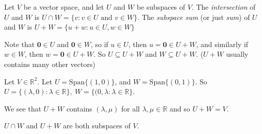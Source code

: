 \documentclass[twoside]{scrartcl}
\begin{document}
\begin{definition} Let $V$ be a vector space, and let $U$ and $W$ be subspaces of $V$. The \emph{intersection} of $U$ and $W$ is $U \cap W = \{v: v \in U \text{ and } v \in W\}$. The \emph{subspace sum} (or just \emph{sum}) of $U$ and $W$ is $U + W = \{u + w: u \in U, w \in W\}$
\end{definition}\vspace*{10pt}

\begin{remark}  Note that $\mathbf{0} \in U$ and $\mathbf{0} \in W$, so if $u \in U$, then $u = \mathbf{0} \in U + W$, and similarly if  $w \in W$, then $w = \mathbf{0} \in U + W$. So $U \subseteq U + W$ and $W \subseteq U + W$. ($U+W$ usually contains many other vectors)
\end{remark}\vspace*{10pt}

\begin{example} Let $V \in \mathbb{R}^2.$ Let $U = \text{Span}\{(1,0)\}$, and  $W = \text{Span}\{(0,1)\}$. So $U = \{(\lambda, 0): \lambda \in \mathbb{R}\}, ~W = \{(0,\lambda: \lambda \in \mathbb{R}\}$.

We see that $U + W$ contains $(\lambda, \mu)$ for all $\lambda, \mu \in \mathbb{R}$ and so $U + W = V$.
\end{example}\vspace*{10pt}



\begin{proposition} $U \cap W$ and $U + W$ are both subspaces of $V$. 	
\end{proposition}
\end{document}
